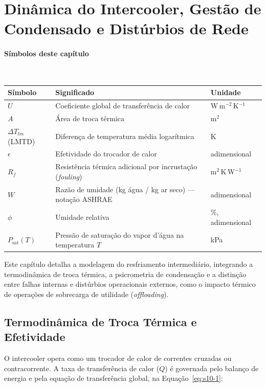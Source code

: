 \documentclass[12pt,a4paper]{article}
\numberwithin{equation}{section}
\numberwithin{table}{section}
\numberwithin{figure}{section}
\begin{document}
{	\clearpage
	\section{\textbf{Dinâmica do Intercooler, Gestão de Condensado e Distúrbios de Rede}}

\paragraph{Símbolos deste capítulo}\mbox{}\\[-0.5em]
{\small
\begin{longtable}{>{\raggedright\arraybackslash}p{2.6cm} >{\raggedright\arraybackslash}p{9.2cm} >{\raggedright\arraybackslash}p{2.6cm}}
	\toprule
	\textbf{Símbolo} & \textbf{Significado} & \textbf{Unidade} \\ \midrule
	\endhead
	$U$ & Coeficiente global de transferência de calor & W\,m$^{-2}$\,K$^{-1}$ \\
	$A$ & Área de troca térmica & m$^2$ \\
	$\Delta T_{lm}$ (LMTD) & Diferença de temperatura média logarítmica & K \\
	$\epsilon$ & Efetividade do trocador de calor & adimensional \\
	$R_f$ & Resistência térmica adicional por incrustação (\textit{fouling}) & m$^2$\,K\,W$^{-1}$ \\
	$W$\dag & Razão de umidade (kg água / kg ar seco) — notação ASHRAE & adimensional \\
	$\phi$ & Umidade relativa & \%, adimensional \\
	$P_{\text{sat}}(T)$ & Pressão de saturação do vapor d'água na temperatura $T$ & kPa \\
	\bottomrule
\end{longtable}
}




	
	Este capítulo detalha a modelagem do resfriamento intermediário, integrando a termodinâmica de troca térmica, a psicrometria de condensação e a distinção entre falhas internas e distúrbios operacionais externos, como o impacto térmico de operações de sobrecarga de utilidade (\textit{offloading}).
	
	\subsection{\textbf{Termodinâmica de Troca Térmica e Efetividade}}
	O intercooler opera como um trocador de calor de correntes cruzadas ou contracorrente. A taxa de transferência de calor ($\dot{Q}$) é governada pelo balanço de energia e pela equação de transferência global, na Equação~\eqref{eq:s10-1}:

}
\end{document}
